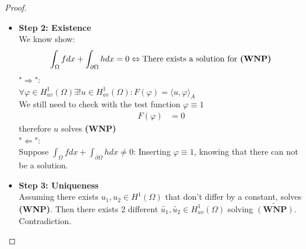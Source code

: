 \begin{proof}
\begin{itemize}
\begin{equation*}
\begin{aligned}
	&u \in H^1_{av}(\Omega)
\end{aligned}
\right.
\end{equation*}
admits an unique solution.
\item \textbf{Step 2: Existence}\\
We know show:
\begin{align*}
	\int_\Omega f dx + \int_{\partial \Omega} h dx = 0 \Leftrightarrow
	\text{There exists a solution for \textbf{(WNP)}}
\end{align*}
"$\Rightarrow$":\\
$\forall \varphi \in H_{av}^1(\Omega) \exists! u \in H_{av}^1(\Omega) : F(\varphi) = \langle u , \varphi \rangle_A$ \\
We still need to check with the test function $\varphi \equiv 1$
\begin{align*}
	F(\varphi) &= 0
\end{align*}
therefore $u$ solves \textbf{(WNP)}\\
"$\Leftarrow$": \\
Suppose $\int_\Omega f dx + \int_{\partial \Omega} h dx \neq 0$: Inserting $\varphi \equiv 1$, knowing that there can not be a solution.
\item 
\textbf{Step 3: Uniqueness}\\  
Assuming there exists $u_1, u_2 \in H^1(\Omega)$ that don't differ by a constant, solves \textbf{(WNP)}. Then there exists 2 different $\tilde{u_1}, \tilde{u_2} \in H^1_{av}(\Omega)$ solving $\tilde{(\textbf{WNP})}$. Contradiction.
\end{itemize}
\end{proof}




